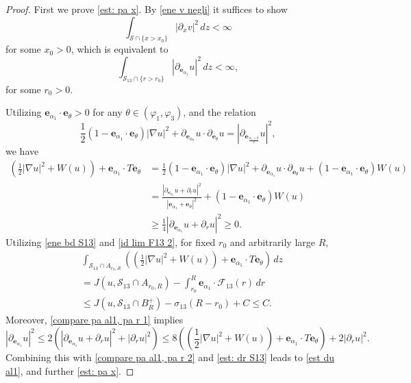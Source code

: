 \documentclass[leqno,11pt]{amsart}
\let\pa=\partial
\let\al=\alpha
\let\f=\frac
\let\pa=\partial
\let\na=\nabla
\theoremstyle{remark}
\begin{document}
\begin{proof}
First we prove \eqref{est: pa x}. By \eqref{ene v negli} it suffices to show 
\begin{equation*}
\int_{\mathcal{S}\cap\{x>x_0\}}|\pa_x v|^2\,dz <\infty   
\end{equation*}
for some $x_0>0$, which is equivalent to
\begin{equation}
\label{est du al1}   \int_{\mathcal{S}_{13}\cap\{r>r_0\}}|\pa_{\mathbf{e}_{\al_1}} u|^2\,dz<\infty, 
\end{equation}
for some $r_0>0$.



Utilizing $\mathbf{e}_{\al_1}\cdot \mathbf{e}_{\theta}>0$ for any $\theta\in(\varphi_1,\varphi_3)$, and the relation
\[
\f12(1-\mathbf{e}_{\al_1}\cdot \mathbf{e}_{\theta})|\na u|^2 +\pa_{\mathbf{e}_{\al_1}} u\cdot \pa_{\mathbf{e}_{\theta}} u=|\pa_{\mathbf{e}_{\f{\al_1+\theta}{2}}} u|^2,
\]
we have
\begin{equation}\label{compare pa al1, pa r 1}
\begin{split}
 \left( \f12|\na u|^2+W(u) \right)+\mathbf{e}_{\al_1}\cdot T\mathbf{e}_{\theta}&=\f12(1-\mathbf{e}_{\al_1}\cdot \mathbf{e}_{\theta})|\na u|^2 +\pa_{\mathbf{e}_{\al_1}} u\cdot \pa_{\mathbf{e}_{\theta}} u+(1-\mathbf{e}_{\al_1}\cdot \mathbf{e}_{\theta}) W(u)\\
 &=\frac{|\pa_{\mathbf{e}_{\al_1}}u+\pa_r u|^2}{|\mathbf{e}_{\al_1}+\mathbf{e}_{\theta}|^2}+(1-\mathbf{e}_{\al_1}\cdot \mathbf{e}_{\theta})W(u)\\
 &\geq \frac14|\pa_{\mathbf{e}_{\al_1}}u+\pa_r u|^2\geq0.
\end{split}
\end{equation}
Utilizing \eqref{ene bd S13} and \eqref{id lim F13 2}, for fixed $r_0$ and arbitrarily large $R$,
\begin{equation}
\label{compare pa al1, pa r 2}
\begin{split}
 &\int_{\mathcal S_{13}\cap A_{r_0,R}}\left(\left(\f12|\na u|^2+W(u) \right)+\mathbf{e}_{\al_1}\cdot T\mathbf{e}_{\theta}\right)\,dz\\
 &=J(u,\mathcal S_{13}\cap A_{r_0,R})-\int_{r_0}^R \mathbf{e}_{\al_1} \cdot \mathcal{F}_{13}(r)\,dr\\
 &\leq J(u, \mathcal{S}_{13}\cap B_R^+)-\sigma_{13}(R-r_0)+C\leq C.
\end{split}
\end{equation}
Moreover, \eqref{compare pa al1, pa r 1} implies
\[
 |\pa_{\mathbf{e}_{\al_1}}u|^2
 \leq 2\left(|\pa_{\mathbf{e}_{\al_1}}u+\pa_r u|^2+|\pa_r u|^2\right)
 \leq 8\left(\left(\f12|\na u|^2+W(u) \right)+\mathbf{e}_{\al_1}\cdot T\mathbf{e}_{\theta}\right)+2|\pa_r u|^2.
\]
Combining this with \eqref{compare pa al1, pa r 2} and \eqref{est: dr S13} leads to \eqref{est du al1}, and further \eqref{est: pa x}. 


\end{proof}
\end{document}
